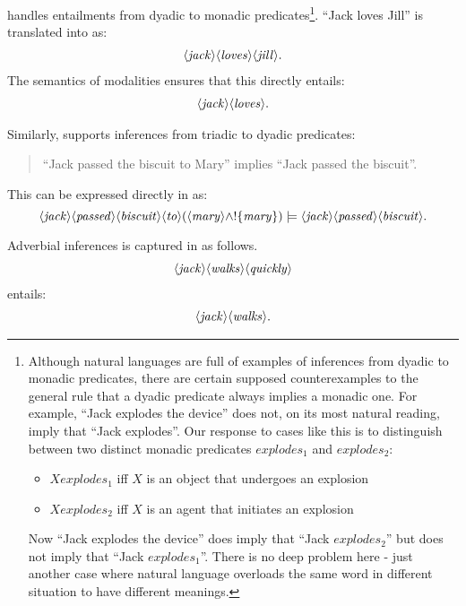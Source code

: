 \NI \Cathoristic{} handles entailments from dyadic to monadic predicates\footnote{Although
  natural languages are full of examples of inferences from dyadic to
  monadic predicates, there are certain supposed counterexamples to
  the general rule that a dyadic predicate always implies a monadic
  one. For example, ``Jack explodes the device'' does not, on its most
  natural reading, imply that ``Jack explodes''. Our response to cases
  like this is to distinguish between two distinct monadic predicates
  $explodes_1$ and $explodes_2$:
 \begin{itemize}
 \item
 $X explodes_1$ iff $X$ is an object that undergoes an explosion
 \item
 $X explodes_2$ iff $X$ is an agent that initiates an explosion
 \end{itemize}
 Now ``Jack explodes the device'' does imply that ``Jack $explodes_2$'' but does not imply that ``Jack $explodes_1$''. 
There is no deep problem here - just another case where natural language overloads the same word in different situation to have different meanings.}.
``Jack loves Jill'' is translated into \cathoristic{} as:
\begin{eqnarray*}
   \langle \mathit{jack} \rangle \langle \mathit{loves} \rangle \langle \mathit{jill} \rangle .
\end{eqnarray*}
The semantics of modalities ensures that this directly entails:
\begin{eqnarray*}
   \langle \mathit{jack} \rangle \langle \mathit{loves} \rangle .
\end{eqnarray*}

\NI Similarly, \cathoristic{} supports inferences from triadic to dyadic
predicates:
\begin{quote}
  ``Jack passed the biscuit to Mary'' implies ``Jack passed the biscuit''.
\end{quote}

\NI This can be expressed directly in \cathoristic{} as:
\[
   \langle \mathit{jack} \rangle \langle \mathit{passed} \rangle \langle \mathit{biscuit} \rangle \langle \mathit{to} \rangle (\langle \mathit{mary} \rangle \land !\{\mathit{mary}\}) \models \langle \mathit{jack} \rangle \langle \mathit{passed} \rangle \langle \mathit{biscuit} \rangle .
\]

\NI Adverbial inferences is captured in \cathoristic{} as follows.
\begin{eqnarray*}
  \langle \mathit{jack} \rangle \langle \mathit{walks} \rangle \langle \mathit{quickly} \rangle \end{eqnarray*}
entails:
\begin{eqnarray*}
  \langle \mathit{jack} \rangle \langle \mathit{walks} \rangle .
\end{eqnarray*}

